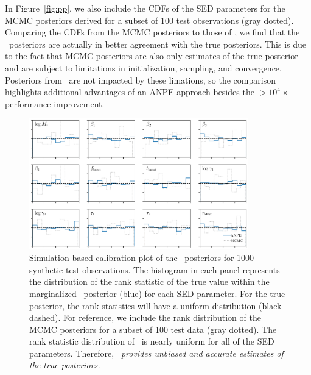 In Figure~\ref{fig:pp}, we also include the CDFs of the SED parameters for the
MCMC posteriors derived for a subset of 100 test observations (gray dotted). 
Comparing the CDFs from the MCMC posteriors to those of \sedflow, we find that
the \sedflow~posteriors are actually in better agreement with the true
posteriors. 
This is due to the fact that MCMC posteriors are also only estimates of the
true posterior and are subject to limitations in initialization, sampling, and
convergence.
Posteriors from \sedflow~are not impacted by these limations, so the comparison
highlights additional advantages of an ANPE approach besides the
${>}10^4\times$ performance improvement.

\begin{figure}
\begin{center}
    \includegraphics[width=0.85\textwidth]{figs/sbc.pdf}
    \caption{\label{fig:sbc}
    Simulation-based calibration plot of the \sedflow~posteriors for 1000
    synthetic test observations. 
    The histogram in each panel represents the distribution of the rank
    statistic of the true value within the marginalized \sedflow~posterior
    (blue) for each SED parameter.
    For the true posterior, the rank statistics will have a uniform
    distribution (black dashed). 
    For reference, we include the rank distribution of the MCMC posteriors for
    a subset of 100 test data (gray dotted). 
    The rank statistic distribution of \sedflow~is nearly uniform for all of
    the SED parameters. 
    Therefore, \emph{\sedflow~provides unbiased and accurate estimates of the
    true posteriors.}
    }
\end{center}
\end{figure}

